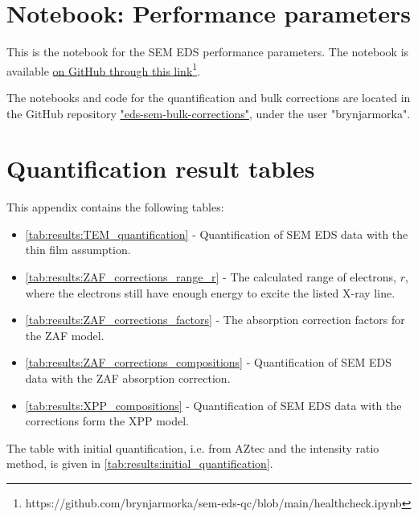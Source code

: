 


\chapter{Notebook: Performance parameters}
\label{appendix:performance}

This is the notebook for the SEM EDS performance parameters.
The notebook is available \href{https://github.com/brynjarmorka/sem-eds-qc/blob/main/healthcheck.ipynb}{on GitHub through this link}\footnote{{https://github.com/brynjarmorka/sem-eds-qc/blob/main/healthcheck.ipynb}}.


The notebooks and code for the quantification and bulk corrections are located in the GitHub repository \href{https://github.com/brynjarmorka/eds-sem-bulk-corrections}{"eds-sem-bulk-corrections"}, under the user "brynjarmorka".









\chapter{Quantification result tables}
\label{appendix:tables}

This appendix contains the following tables:

\begin{itemize}
    \item \cref{tab:results:TEM_quantification} - Quantification of SEM EDS data with the thin film assumption.
    \item \cref{tab:results:ZAF_corrections_range_r} - The calculated range of electrons, $r$, where the electrons still have enough energy to excite the listed X-ray line.
    \item \cref{tab:results:ZAF_corrections_factors} - The absorption correction factors for the ZAF model.
    \item \cref{tab:results:ZAF_corrections_compositions} - Quantification of SEM EDS data with the ZAF absorption correction.
    \item \cref{tab:results:XPP_compositions} - Quantification of SEM EDS data with the corrections form the XPP model.    
\end{itemize}

The table with initial quantification, i.e. from AZtec and the intensity ratio method, is given in \cref{tab:results:initial_quantification}.







